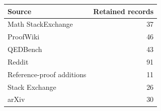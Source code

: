 \begin{tabular}{lr}
\toprule
Source & Retained records \\
\midrule
Math StackExchange & 37 \\
ProofWiki & 46 \\
QEDBench & 43 \\
Reddit & 91 \\
Reference-proof additions & 11 \\
Stack Exchange & 26 \\
arXiv & 30 \\
\bottomrule
\end{tabular}
